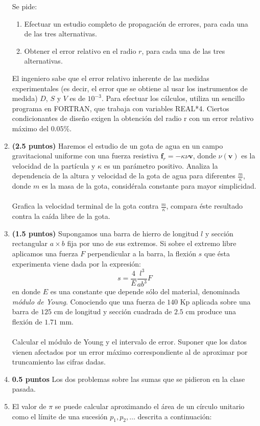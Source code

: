 \documentclass[11pt]{article}
\begin{document}
\begin{enumerate}
\begin{itemize}
\end{itemize}
Se pide:
\begin{enumerate}
\item Efectuar un estudio completo de propagaci\'{o}n de errores, para cada una de las tres alternativas.
\item Obtener el error relativo en el radio $r$, para cada una de las tres alternativas.
\end{enumerate}
El ingeniero sabe que el error relativo inherente de las medidas experimentales (es decir, el error que se obtiene al usar los instrumentos de medida) $D$, $S$ y $V$ es de $10^{-3}$. Para efectuar los cálculos, utiliza un sencillo programa en FORTRAN, que trabaja con variables REAL*4. Ciertos condicionantes de diseño exigen la obtención del radio r con un error relativo máximo del $0.05 \%$.
\item \textbf{(2.5 puntos) } Haremos el estudio de un gota de agua en un campo gravitacional uniforme con una fuerza resistiva $\textbf{f}_{r} = - \kappa \nu \textbf{v} $, donde $\nu(\textbf{v})$ es la velocidad de la part\'{i}cula y $\kappa$ es un par\'{a}metro positivo.  Analiza la dependencia de la altura y velocidad de la gota de agua para diferentes $\frac{m}{\kappa}$, donde $m$ es la masa de la gota, consid\'{e}rala constante para mayor simplicidad.
\\
\\
Grafica la velocidad terminal de la gota contra $\frac{m}{\kappa}$, compara \'{e}ste resultado contra la ca\'{i}da libre de la gota.
\item \textbf{(1.5 puntos) }Supongamos una barra de hierro de longitud $l$ y sección rectangular $a \times b$ fija por uno de sus extremos. Si sobre el extremo libre aplicamos una fuerza $F$ perpendicular a la barra, la flexión $s$ que ésta experimenta viene dada por la expresión: 
\[s = \dfrac{4}{E} \dfrac{l^{3}}{ab^{3}} F\]
en donde $E$ es una constante que depende sólo del material, denominada \textit{módulo de Young}. Conociendo que una fuerza de $140$ Kp aplicada sobre una barra de $125$ cm de longitud y sección
cuadrada de $2.5$ cm produce una flexión de $1.71$ mm.
\\
\\ Calcular el módulo de Young y el intervalo de error. Suponer que los datos vienen afectados por un error máximo correspondiente al de aproximar por truncamiento las cifras dadas.
\item \textbf{0.5 puntos } Los dos problemas sobre las sumas que se pidieron en la clase pasada.
\item El valor de $\pi$ se puede calcular aproximando el \'{a}rea de un c\'{i}rculo unitario como el l\'{i}mite de una sucesi\'{o}n $p_{1}, p_{2}, \ldots$ descrita a continuaci\'{o}n:

\end{enumerate}
\end{document}
